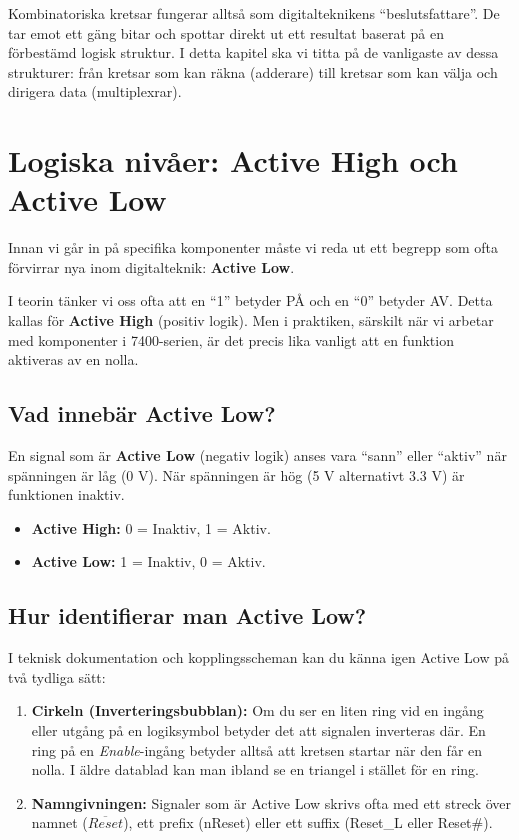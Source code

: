 \documentclass[
  swedish,
  letterpaper,
  oneside,
  openany]{book}
\providecommand{\tightlist}{%
  \setlength{\itemsep}{0pt}\setlength{\parskip}{0pt}}
\begin{document}
Kombinatoriska kretsar fungerar alltså som digitalteknikens
``beslutsfattare''. De tar emot ett gäng bitar och spottar direkt ut ett
resultat baserat på en förbestämd logisk struktur. I detta kapitel ska
vi titta på de vanligaste av dessa strukturer: från kretsar som kan
räkna (adderare) till kretsar som kan välja och dirigera data
(multiplexrar).

\section{Logiska nivåer: Active High och Active
Low}\label{sec-active-high-low}

Innan vi går in på specifika komponenter måste vi reda ut ett begrepp
som ofta förvirrar nya inom digitalteknik: \textbf{Active Low}.

I teorin tänker vi oss ofta att en ``1'' betyder PÅ och en ``0'' betyder
AV. Detta kallas för \textbf{Active High} (positiv logik). Men i
praktiken, särskilt när vi arbetar med komponenter i 7400-serien, är det
precis lika vanligt att en funktion aktiveras av en nolla.

\subsection{Vad innebär Active Low?}\label{sec-active-low}

En signal som är \textbf{Active Low} (negativ logik) anses vara ``sann''
eller ``aktiv'' när spänningen är låg (0 V). När spänningen är hög (5 V
alternativt 3.3 V) är funktionen inaktiv.

\begin{itemize}
\tightlist
\item
  \textbf{Active High:} 0 = Inaktiv, 1 = Aktiv.
\item
  \textbf{Active Low:} 1 = Inaktiv, 0 = Aktiv.
\end{itemize}

\subsection{Hur identifierar man Active
Low?}\label{sec-hur-identifiera-active-low}

I teknisk dokumentation och kopplingsscheman kan du känna igen Active
Low på två tydliga sätt:

\begin{enumerate}
\def\labelenumi{\arabic{enumi}.}
\tightlist
\item
  \textbf{Cirkeln (Inverteringsbubblan):} Om du ser en liten ring vid en
  ingång eller utgång på en logiksymbol betyder det att signalen
  inverteras där. En ring på en \emph{Enable}-ingång betyder alltså att
  kretsen startar när den får en nolla. I äldre datablad kan man ibland
  se en triangel i stället för en ring.
\item
  \textbf{Namngivningen:} Signaler som är Active Low skrivs ofta med ett
  streck över namnet (\(\overline{Reset}\)), ett prefix (nReset) eller
  ett suffix (Reset\_L eller Reset\#).
\end{enumerate}
\end{document}
